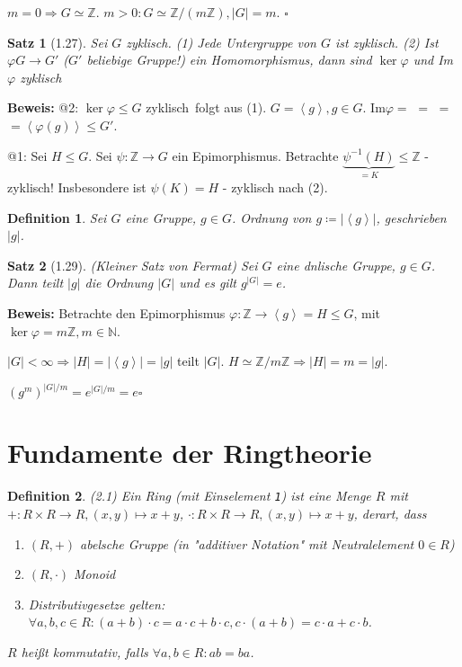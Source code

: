\documentclass[10pt,a4paper]{article}
\newtheorem{defi}{Definition}
\newtheorem{satz}{Satz}
\begin{document}
$m=0 \Rightarrow G \simeq \mathbb{Z}$. $m > 0: G \simeq
\mathbb{Z} / (m \mathbb{Z}), \vert G \vert = m$. $\square$

\begin{satz}[1.27]
Sei $G$ zyklisch. (1) Jede Untergruppe von $G$ ist zyklisch. (2) Ist $\varphi G \to G'$ ($G'$ beliebige Gruppe!) ein Homomorphismus, dann sind $\ker \varphi$ und Im$\varphi$ zyklisch
\end{satz}
\textbf{Beweis:} @2: \glqq $\ker\varphi \leqslant G$ zyklisch\grqq\ folgt aus (1). $G = \left< g \right>, g \in G$. Im$\varphi =$   $=$  $=$  $= \left< \varphi(g) \right> \leqslant G'$.

@1: Sei $H \leq G$. Sei $\psi : \mathbb{Z} \to G$ ein Epimorphismus. Betrachte $\underbrace{\psi^{-1}(H)}_{= K} \leqslant \mathbb{Z}$ - zyklisch! Insbesondere ist $\psi(K) = H$ - zyklisch nach (2).

\begin{defi}
Sei $G$ eine Gruppe, $g \in G$. Ordnung von $g \coloneqq \vert \left< g \right> \vert$, geschrieben $\vert g \vert$.
\end{defi}

\begin{satz}[1.29](Kleiner Satz von Fermat)
Sei $G$ eine dnlische Gruppe, $g \in G$. Dann teilt $\vert g \vert$ die Ordnung $\vert G \vert$ und es gilt $g^{\vert G \vert} = e$.
\end{satz}
\textbf{Beweis:} Betrachte den Epimorphismus $\varphi: \mathbb{Z} \to \left< g \right> = H \leqslant G$, mit $\ker \varphi = m \mathbb{Z}, m \in \mathbb{N}$.

$\vert G \vert < \infty \Rightarrow \vert H \vert = \vert \left< g \right> \vert = \vert g \vert$ teilt $\vert G \vert$. $H \simeq \mathbb{Z} / m\mathbb{Z} \Rightarrow \vert H \vert = m = \vert g \vert.$

$(g^m)^{\vert G \vert / m} = e^{\vert G \vert / m} = e \square$\bigskip

\section{Fundamente der Ringtheorie}

\begin{defi}(2.1)
Ein \emph{Ring} (mit Einselement \texttt{1}) ist eine Menge $R$ mit $+ : R \times R \to R, (x,y) \mapsto x + y$, $\cdot : R \times R \to R, (x,y) \mapsto x + y$, derart, dass
\begin{enumerate}
\item $(R,+)$ abelsche Gruppe (in "additiver Notation" mit Neutralelement $0 \in R$)
\item $(R, \cdot)$ Monoid
\item Distributivgesetze gelten: $\forall a,b,c \in R: (a+b) \cdot c = a  \cdot c + b \cdot c, c \cdot (a+b) = c \cdot a + c \cdot b$.
\end{enumerate}
$R$ heißt \emph{kommutativ}, falls $\forall a,b \in R: ab = ba$.
\end{defi}
\end{document}
